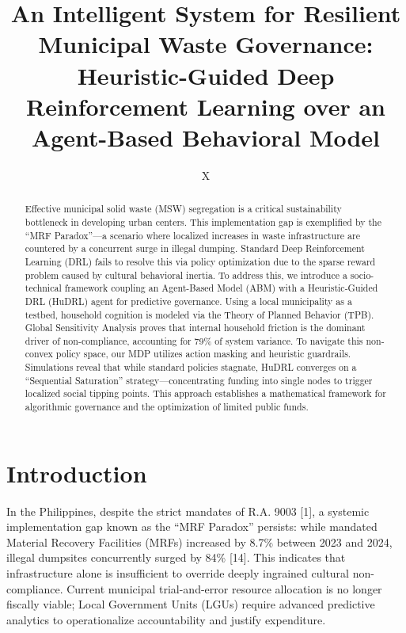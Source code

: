 \documentclass[runningheads]{llncs}
\begin{document}
\title{An Intelligent System for Resilient Municipal Waste Governance: Heuristic-Guided Deep Reinforcement Learning over an Agent-Based Behavioral Model}

\author{X}


\maketitle              

\begin{abstract}
Effective municipal solid waste (MSW) segregation is a critical sustainability bottleneck in developing urban centers. This implementation gap is exemplified by the ``MRF Paradox''---a scenario where localized increases in waste infrastructure are countered by a concurrent surge in illegal dumping. Standard Deep Reinforcement Learning (DRL) fails to resolve this via policy optimization due to the sparse reward problem caused by cultural behavioral inertia. To address this, we introduce a socio-technical framework coupling an Agent-Based Model (ABM) with a Heuristic-Guided DRL (HuDRL) agent for predictive governance. Using a local municipality as a testbed, household cognition is modeled via the Theory of Planned Behavior (TPB). Global Sensitivity Analysis proves that internal household friction is the dominant driver of non-compliance, accounting for 79\% of system variance. To navigate this non-convex policy space, our MDP utilizes action masking and heuristic guardrails. Simulations reveal that while standard policies stagnate, HuDRL converges on a ``Sequential Saturation'' strategy---concentrating funding into single nodes to trigger localized social tipping points. This approach establishes a mathematical framework for algorithmic governance and the optimization of limited public funds.

\end{abstract}

\section{Introduction}
In the Philippines, despite the strict mandates of R.A. 9003 [1], a systemic implementation gap known as the ``MRF Paradox'' persists: while mandated Material Recovery Facilities (MRFs) increased by 8.7\% between 2023 and 2024, illegal dumpsites concurrently surged by 84\% [14]. This indicates that infrastructure alone is insufficient to override deeply ingrained cultural non-compliance. Current municipal trial-and-error resource allocation is no longer fiscally viable; Local Government Units (LGUs) require advanced predictive analytics to operationalize accountability and justify expenditure.
\end{document}
